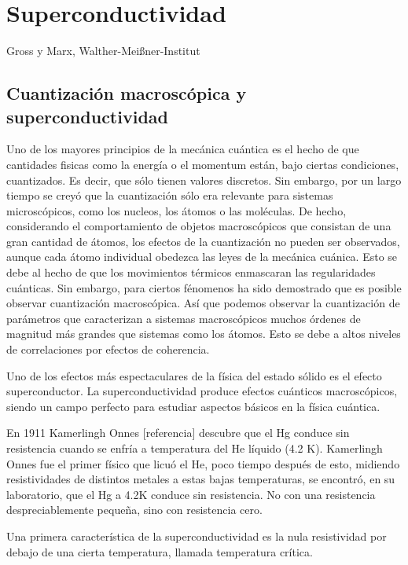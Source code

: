 \chapter{Superconductividad}

Gross y Marx, Walther-Meißner-Institut \cite{gross}

\section{Cuantización macroscópica y superconductividad}

Uno de los mayores principios de la mecánica cuántica es el hecho de que cantidades fisicas como la energía o el momentum están, bajo ciertas condiciones, cuantizados. Es decir, que sólo tienen valores discretos. Sin embargo, por un largo tiempo se creyó que la cuantización sólo era relevante para sistemas microscópicos, como los nucleos, los átomos o las moléculas. De hecho, considerando el comportamiento de objetos macroscópicos que consistan de una gran cantidad de átomos, los efectos de la cuantización no pueden ser observados, aunque cada átomo individual obedezca las leyes de la mecánica cuánica. Esto se debe al hecho de que los movimientos térmicos enmascaran las regularidades cuánticas. Sin embargo, para ciertos fénomenos ha sido demostrado que es posible observar cuantización macroscópica. Así que podemos observar la cuantización de parámetros que caracterizan a sistemas macroscópicos muchos órdenes de magnitud más grandes que sistemas como los átomos. Esto se debe a altos niveles de correlaciones por efectos de coherencia.

Uno de los efectos más espectaculares de la física del estado sólido es el efecto superconductor. La superconductividad produce efectos cuánticos macroscópicos, siendo un campo perfecto para estudiar aspectos básicos en la física cuántica.

En 1911 Kamerlingh Onnes [referencia] descubre que el Hg conduce sin resistencia cuando se enfría a temperatura del He líquido (4.2 K). Kamerlingh Onnes fue el primer físico que licuó el He, poco tiempo después de esto, midiendo resistividades de distintos metales a estas bajas temperaturas, se encontró, en su laboratorio, que el Hg a 4.2K conduce sin resistencia. No con una resistencia despreciablemente pequeña, sino con resistencia cero.

Una primera característica de la superconductividad es la nula resistividad por debajo de una cierta temperatura, llamada temperatura crítica.

